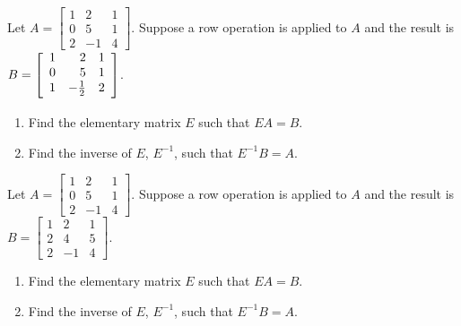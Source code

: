 \documentclass{ximera}
\begin{document}
\begin{problem}\label{prb:4.59}
Let $A = \left[ \begin{array}{rrr}
1 & 2 & 1  \\
0 & 5 & 1 \\
2 & -1 & 4
\end{array}\right]$. Suppose a row operation is applied to $A$ and the result is $B = \left[ \begin{array}{rrr}
1 & 2 & 1\\
0 & 5 & 1 \\
1 & -\vspace{0.05in}\frac{1}{2} & 2
\end{array}\right]$.
\begin{enumerate}
\item Find the elementary matrix $E$ such that $EA = B$.

\item Find the inverse of $E$, $E^{-1}$, such that $E^{-1}B = A$.
\end{enumerate}
\end{problem}


\begin{problem}\label{prb:4.60}
Let $A = \left[ \begin{array}{rrr}
1 & 2 & 1  \\
0 & 5 & 1 \\
2 & -1 & 4
\end{array}\right]$. Suppose a row operation is applied to $A$ and the result is $B = \left[ \begin{array}{rrr}
1 & 2 & 1\\
2 & 4 & 5 \\
2 & -1 & 4
\end{array}\right]$.
\begin{enumerate}
\item Find the elementary matrix $E$ such that $EA = B$.

\item Find the inverse of $E$, $E^{-1}$, such that $E^{-1}B = A$.
\end{enumerate}
\end{problem}
\end{document}
